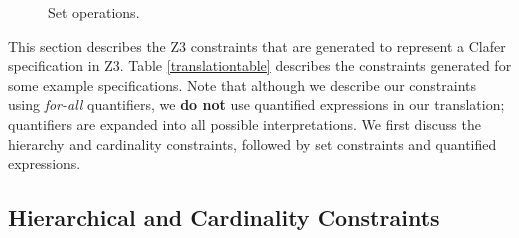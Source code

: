 \documentclass{easychair}
\begin{document}
\begin{figure}


\caption{Set operations.}
\label{setoperations}
\end{figure}
This section describes the Z3 constraints that are generated to represent a Clafer specification in Z3. Table \ref{translationtable} describes the constraints generated for some example specifications. Note that although we describe our constraints using \textit{for-all} quantifiers, we \textbf{do not} use quantified expressions in our translation; quantifiers are expanded into all possible interpretations. We first discuss the hierarchy and cardinality constraints, followed by set constraints and quantified expressions.

\subsection{Hierarchical and Cardinality Constraints}
\end{document}
